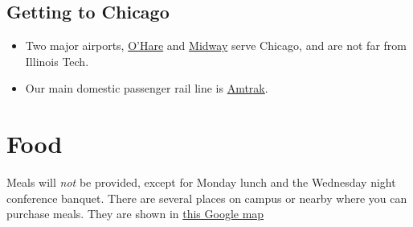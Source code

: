 \subsection{Getting to Chicago}

\begin{itemize}
  \item Two major airports, \href{https://www.flychicago.com/ohare/home/Pages/default.aspx}{O'Hare} and \href{https://www.flychicago.com/midway/pages/default.aspx}{Midway} serve Chicago, and are not far from Illinois Tech.
  \item Our main domestic passenger rail line is \href{https://www.amtrak.com/home.html}{Amtrak}.
\end{itemize}


\section{Food}

Meals will \emph{not} be provided, except for Monday lunch and the Wednesday night conference banquet. There are several places on campus or nearby where you can purchase meals.  They are shown in \href{https://www.google.com/maps/d/u/1/edit?mid=1QH5guZDg-m8_f1oO9HgZ5sIL76q1gdk&usp=sharing}{this Google map}



